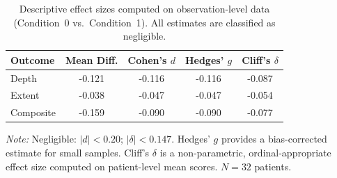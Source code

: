 \begin{table}[htbp]
\centering
\caption{Descriptive effect sizes computed on observation-level data (Condition~0 vs.\ Condition~1). All estimates are classified as negligible.}
\label{tab:effect-sizes}
\begin{tabular}{l S[table-format=-1.3] S[table-format=-1.3] S[table-format=-1.3] S[table-format=-1.3]}
\toprule
{Outcome} & {Mean Diff.} & {Cohen's $d$} & {Hedges' $g$} & {Cliff's $\delta$} \\
\midrule
Depth     & -0.121 & -0.116 & -0.116 & -0.087 \\
Extent    & -0.038 & -0.047 & -0.047 & -0.054 \\
Composite & -0.159 & -0.090 & -0.090 & -0.077 \\
\bottomrule
\end{tabular}
\smallskip

\noindent\textit{Note:} Negligible: $|d| < 0.20$; $|\delta| < 0.147$. Hedges' $g$ provides a bias-corrected estimate for small samples. Cliff's $\delta$ is a non-parametric, ordinal-appropriate effect size computed on patient-level mean scores. $N = 32$ patients.
\end{table}
